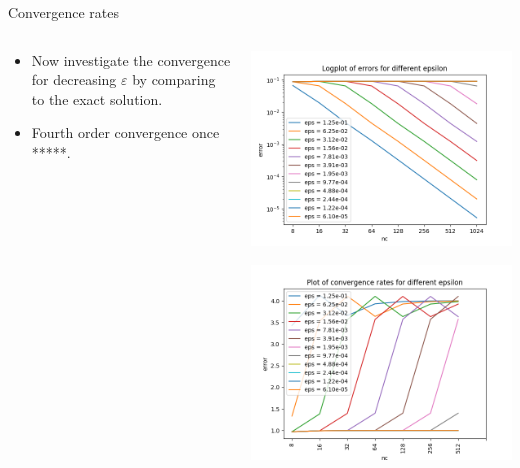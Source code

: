 \documentclass{beamer}
\renewcommand{\epsilon}{\varepsilon}
\begin{document}
\begin{frame}[t]{Convergence rates}
\begin{columns}
    \begin{column}[c]{.5\textwidth}
      \begin{itemize}
      \item Now investigate the convergence for decreasing $\epsilon$ by comparing to the exact solution.
      \item Fourth order convergence once *****.
    \end{itemize}
  \end{column}
  \begin{column}[c]{.5\textwidth}

    \includegraphics[width=0.85\linewidth]{one_dim_h_eps1.png}

    \includegraphics[width=0.85\linewidth]{one_dim_h_eps2.png}
 \end{column}
\end{columns}
\end{frame}
\end{document}

